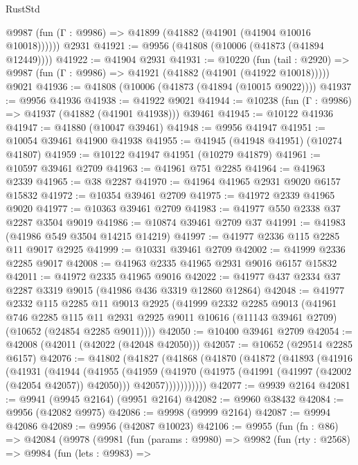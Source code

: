 \begin{lexlean}{RustStd}
\begin{coremodule}
      @9987 (fun (Γ : @9986) => @41899 (@41882 (@41901 (@41904 @10016 @10018))))))
    @2931
@41921 := @9956 (@41808 (@10006 (@41873 (@41894 @12449))))
@41922 := @41904 @2931
@41931 := @10220
    (fun (tail : @2920) => @9987 (fun (Γ : @9986) => @41921 (@41882 (@41901 (@41922 @10018)))))
    @9021
@41936 := @41808 (@10006 (@41873 (@41894 (@10015 @9022))))
@41937 := @9956 @41936
@41938 := @41922 @9021
@41944 := @10238 (fun (Γ : @9986) => @41937 (@41882 (@41901 @41938))) @39461
@41945 := @10122 @41936
@41947 := @41880 (@10047 @39461)
@41948 := @9956 @41947
@41951 := @10054 @39461 @41900 @41938
@41955 := @41945 (@41948 @41951) (@10274 @41807)
@41959 := @10122 @41947 @41951 (@10279 @41879)
@41961 := @10597 @39461 @2709
@41963 := @41961 @751 @2285
@41964 := @41963 @2339
@41965 := @38 @2287
@41970 := @41964 @41965 @2931 @9020 @6157 @15832
@41972 := @10354 @39461 @2709
@41975 := @41972 @2339 @41965 @9020
@41977 := @10363 @39461 @2709
@41983 := @41977 @550 @2338 @37 @2287 @3504 @9019
@41986 := @10874 @39461 @2709 @37
@41991 := @41983 (@41986 @549 @3504 @14215 @14219)
@41997 := @41977 @2336 @115 @2285 @11 @9017 @2925
@41999 := @10331 @39461 @2709
@42002 := @41999 @2336 @2285 @9017
@42008 := @41963 @2335 @41965 @2931 @9016 @6157 @15832
@42011 := @41972 @2335 @41965 @9016
@42022 := @41977 @437 @2334 @37 @2287 @3319 @9015 (@41986 @436 @3319 @12860 @12864)
@42048 := @41977
    @2332
    @115
    @2285
    @11
    @9013
    @2925
    (@41999
      @2332
      @2285
      @9013
      (@41961
        @746
        @2285
        @115
        @11
        @2931
        @2925
        @9011
        @10616
        (@11143 @39461 @2709)
        (@10652 (@24854 @2285 @9011))))
@42050 := @10400 @39461 @2709
@42054 := @42008 (@42011 (@42022 (@42048 @42050)))
@42057 := @10652 (@29514 @2285 @6157)
@42076 := @41802
    (@41827
      (@41868
        (@41870
          (@41872
            (@41893
              (@41916
                (@41931
                  (@41944
                    (@41955
                      (@41959
                        (@41970
                          (@41975 (@41991 (@41997 (@42002 (@42054 @42057)) @42050)))
                          @42057)))))))))))
@42077 := @9939 @2164
@42081 := @9941 (@9945 @2164) (@9951 @2164)
@42082 := @9960 @38432
@42084 := @9956 (@42082 @9975)
@42086 := @9998 (@9999 @2164)
@42087 := @9994 @42086
@42089 := @9956 (@42087 @10023)
@42106 := @9955
    (fun (fn : @86) =>
    @42084
      (@9978
        (@9981
          (fun (params : @9980) =>
          @9982
            (fun (rty : @2568) =>
            @9984
              (fun (lets : @9983) =>

\end{coremodule}
\end{lexlean}
